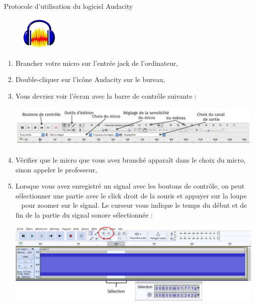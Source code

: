 \begin{doc}{Protocole d'utilisation du logiciel Audacity}
\vspace{-1cm}
\begin{figure}
\vspace{-0.6cm}
    \centering
     \includegraphics[width=0.15\textwidth]{Images/TP/TP8/Audacity_icone.jpeg}
   \end{figure}
\begin{enumerate}
    \item Brancher votre micro sur l'entrée jack de l'ordinateur,
    \item Double-cliquer sur l'icône Audacity sur le bureau,
    \item Vous devriez voir l'écran avec la barre de contrôle suivante :
        \begin{center}
        \includegraphics[scale=0.6]{Images/TP/TP8/Audacity.PNG}
        \end{center}
    \item Vérifier que le micro que vous avez branché apparaît dans le choix du micro, sinon appeler le professeur,
    \item Lorsque vous avez enregistré un signal avec les boutons de contrôle, on peut sélectionner une partie avec le click droit de la souris et appuyer sur la \og loupe \fg~ pour zoomer sur le signal. Le curseur vous indique le temps du début et de fin de la partie du signal sonore sélectionnée :
    \begin{center}
        \includegraphics[scale=0.5]{Images/TP/TP8/Audacity_son.png}
    \end{center}
    
\end{enumerate}

\end{doc}

